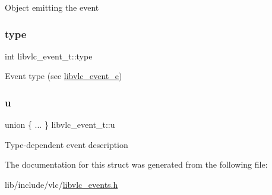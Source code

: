 Object emitting the event \mbox{\label{structlibvlc__event__t_a017811f024025b4879ad5f942598c096}} 
\subsubsection{\texorpdfstring{type}{type}}
{\footnotesize\ttfamily int libvlc\+\_\+event\+\_\+t\+::type}

Event type (see \hyperlink{group__libvlc__event_ga284c010ecde8abca7d3f262392f62fc6}{libvlc\+\_\+event\+\_\+e}) \mbox{\label{structlibvlc__event__t_a5fc50a719c82dc3c83af25a8952a8222}} 
\subsubsection{\texorpdfstring{u}{u}}
{\footnotesize\ttfamily union \{ ... \}   libvlc\+\_\+event\+\_\+t\+::u}

Type-\/dependent event description 

The documentation for this struct was generated from the following file\+:\begin{DoxyCompactItemize}
\item 
lib/include/vlc/\hyperlink{libvlc__events_8h}{libvlc\+\_\+events.\+h}\end{DoxyCompactItemize}
